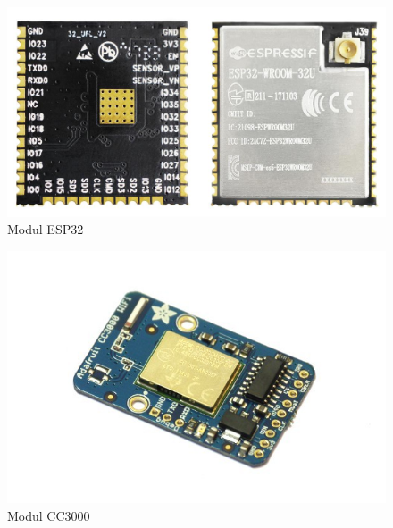 \documentclass[times, utf8, zavrsni]{fer}
\begin{document}
\begin{figure}[h]
    \centering
    \includegraphics[scale=0.5]{esp32.jpg}
    \caption{Modul ESP32}
\end{figure}

\begin{figure}[h]
    \centering
    \includegraphics[scale=0.5]{CC3000.jpg}
    \caption{Modul CC3000}
\end{figure}
\end{document}
